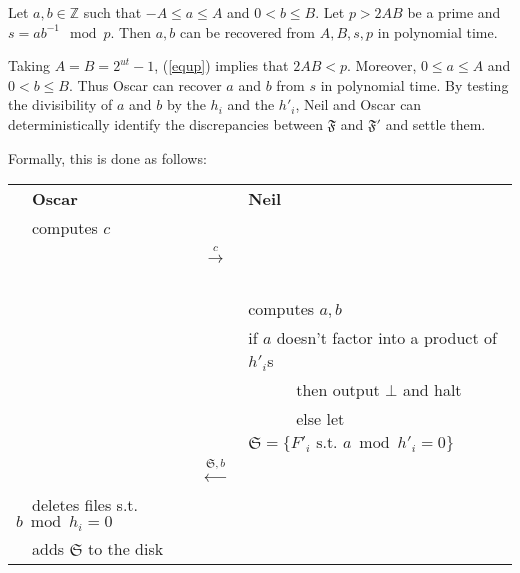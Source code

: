 \documentclass[11pt]{llncs}
\begin{document}
\begin{theorem}
\label{theo}
Let $a,b \in {\mathbb Z}$ such that $-A \leq a \leq A$ and $0<b \leq B$. Let $p>2AB$ be a prime and $s=a b^{-1} \mod p$.
Then $a,b$ can be recovered from $A,B,s,p$ in polynomial time.
\end{theorem}

Taking $A=B=2^{ut}-1$, (\ref{equp}) implies that $2AB<p$. Moreover, $0 \leq a \leq A$ and $0 <b \leq B$. Thus Oscar can
recover $a$ and $b$ from $s$ in polynomial time. By testing the divisibility of $a$ and $b$ by the $h_i$ and the $h'_i$, Neil and Oscar can
deterministically identify the discrepancies between $\mathfrak{F}$ and $\mathfrak{F}'$ and settle them.\smallskip

Formally, this is done as follows:\smallskip

\begin{center}
\begin{tabular}{|lcl|}\hline
~~{\bf Oscar}                       &                                                      &   {\bf Neil}~\\
~~computes $c$&                                                      &\\
                                   &~~{{\LARGE $\stackrel{c}{\longrightarrow}$}}~~        &   \\
                                   &                                                      &computes $a,b$~\\
                                   &                                                      &if $a$ doesn't factor into a product of $h'_i$s~\\
                                   &                                                      &~~~~~~then output $\bot$ and halt~\\
                                   &                                                      &~~~~~~else let $\mathfrak{S}=\{F'_i \mbox{~s.t.~} a \bmod h'_i =0\}$~~\\
                                   &~~{\LARGE $\stackrel{\mathfrak{S},b}{\longleftarrow}$}&\\
~~deletes files s.t. $b \bmod h_i =0$&                                                      &\\
~~adds $\mathfrak{S}$ to the disk    &                                                      &\\\hline
\end{tabular}
\end{center}
\end{document}
